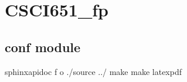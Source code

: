 \documentclass[letterpaper,10pt,english]{sphinxmanual}
\begin{document}
\sphinxstepscope


\chapter{CSCI651\_fp}
\label{\detokenize{modules:csci651-fp}}\label{\detokenize{modules::doc}}
\sphinxstepscope


\section{conf module}
\label{\detokenize{conf:module-conf}}\label{\detokenize{conf:conf-module}}\label{\detokenize{conf::doc}}\begin{description}
\sphinxAtStartPar
sphinx\sphinxhyphen{}apidoc \sphinxhyphen{}f \sphinxhyphen{}o ./source ../
make make latexpdf

\end{description}


\renewcommand{\indexname}{Python Module Index}
\begin{sphinxtheindex}
\let\bigletter\sphinxstyleindexlettergroup
\bigletter{c}
\item\relax{}
\indexspace
\bigletter{m}
\item\relax{}
\end{sphinxtheindex}

\renewcommand{\indexname}{Index}
\printindex
\end{document}
